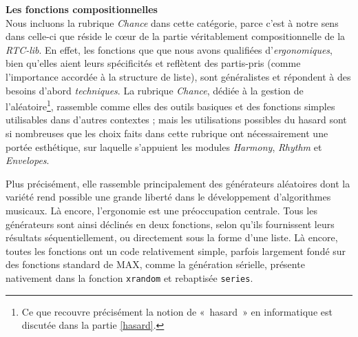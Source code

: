 \documentclass[a4paper,12pt]{article}
\newcommand{\guill}[1]{«~#1~»}
\begin{document}
\textbf{Les fonctions compositionnelles} \\
Nous incluons la rubrique \emph{Chance} dans cette catégorie, parce c'est à notre sens dans celle-ci que réside le cœur de la partie véritablement compositionnelle de la \emph{RTC-lib}. En effet, les fonctions que que nous avons qualifiées d'\emph{ergonomiques}, bien qu'elles aient leurs spécificités et reflètent des partis-pris (comme l'importance accordée à la structure de liste), sont généralistes et répondent à des besoins d'abord \emph{techniques}. La rubrique \emph{Chance}, dédiée à la gestion de l'aléatoire\footnote{Ce que recouvre précisément la notion de \guill{hasard} en informatique est discutée dans la partie \ref{hasard}.}, rassemble comme elles des outils basiques et des fonctions simples utilisables dans d'autres contextes ; mais les utilisations possibles du hasard sont si nombreuses que les choix faits dans cette rubrique ont nécessairement une portée esthétique, sur laquelle s'appuient les modules \emph{Harmony}, \emph{Rhythm} et \emph{Envelopes}.

Plus précisément, elle rassemble principalement des générateurs aléatoires dont la variété rend possible une grande liberté dans le développement d'algorithmes musicaux. Là encore, l'ergonomie est une préoccupation centrale. Tous les générateurs sont ainsi déclinés en deux fonctions, selon qu'ils fournissent leurs résultats séquentiellement, ou directement sous la forme d'une liste. Là encore, toutes les fonctions ont un code relativement simple, parfois largement fondé sur des fonctions standard de MAX, comme la génération sérielle, présente nativement dans la fonction \texttt{xrandom} et rebaptisée \texttt{series}.
\end{document}
